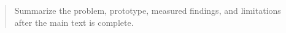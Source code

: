 \begin{abstract}
Summarize the problem, prototype, measured findings, and limitations after the main text is complete.
\end{abstract}
